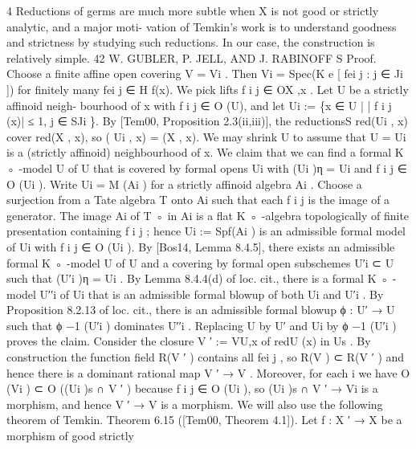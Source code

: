 \documentclass[
  10pt,
]{article}
\newenvironment{Shaded}{}{}
\newcommand{\NormalTok}[1]{#1}
\begin{document}
\begin{Shaded}
\begin{Highlighting}[]
\NormalTok{  4}
\NormalTok{    Reductions of germs are much more subtle when X is not good or strictly analytic, and a major moti{-}}
\NormalTok{vation of Temkin’s work is to understand goodness and strictness by studying such reductions. In our case,}
\NormalTok{the construction is relatively simple.}
\NormalTok{42                                 W. GUBLER, P. JELL, AND J. RABINOFF}
\NormalTok{                                                          S}
\NormalTok{Proof. Choose a finite affine open covering V = Vi . Then Vi = Spec(K                e [ fei j : j ∈ Ji ])}
\NormalTok{for finitely many fei j ∈ H  f(x). We pick lifts f i j ∈ OX ,x . Let U be a strictly affinoid neigh{-}}
\NormalTok{bourhood of x with f i j ∈ O (U), and let Ui := \{x ∈ U | | f i j (x)| ≤ 1, j ∈   SJi \}. By [Tem00,}
\NormalTok{Proposition 2.3(ii,iii)], the reductionsS   red(Ui , x) cover red(X , x), so ( Ui , x) = (X , x).}
\NormalTok{We may shrink U to assume that U = Ui is a (strictly affinoid) neighbourhood of x.}
\NormalTok{   We claim that we can find a formal K ◦ {-}model U of U that is covered by formal opens}
\NormalTok{Ui with (Ui )η = Ui and f i j ∈ O (Ui ). Write Ui = M (Ai ) for a strictly affinoid algebra Ai .}
\NormalTok{Choose a surjection from a Tate algebra T onto Ai such that each f i j is the image of a}
\NormalTok{generator. The image Ai of T ◦ in Ai is a flat K ◦ {-}algebra topologically of finite presentation}
\NormalTok{containing f i j ; hence Ui := Spf(Ai ) is an admissible formal model of Ui with f i j ∈ O (Ui ).}
\NormalTok{By [Bos14, Lemma 8.4.5], there exists an admissible formal K ◦ {-}model U of U and a}
\NormalTok{covering by formal open subschemes U′i ⊂ U such that (U′i )η = Ui . By Lemma 8.4.4(d)}
\NormalTok{of loc. cit., there is a formal K ◦ {-}model U′′i of Ui that is an admissible formal blowup of}
\NormalTok{both Ui and U′i . By Proposition 8.2.13 of loc. cit., there is an admissible formal blowup}
\NormalTok{ϕ : U′ → U such that ϕ −1 (U′i ) dominates U′′i . Replacing U by U′ and Ui by ϕ −1 (U′i ) proves}
\NormalTok{the claim.}
\NormalTok{   Consider the closure V ′ := VU,x of redU (x) in Us . By construction the function field}
\NormalTok{R(V ′ ) contains all fei j , so R(V ) ⊂ R(V ′ ) and hence there is a dominant rational map}
\NormalTok{V ′ → V . Moreover, for each i we have O (Vi ) ⊂ O ((Ui )s ∩ V ′ ) because f i j ∈ O (Ui ), so}
\NormalTok{(Ui )s ∩ V ′ → Vi is a morphism, and hence V ′ → V is a morphism.                                       }
\NormalTok{     We will also use the following theorem of Temkin.}
\NormalTok{Theorem 6.15 ([Tem00, Theorem 4.1]). Let f : X ′ → X be a morphism of good strictly}

\end{Highlighting}
\end{Shaded}
\end{document}

